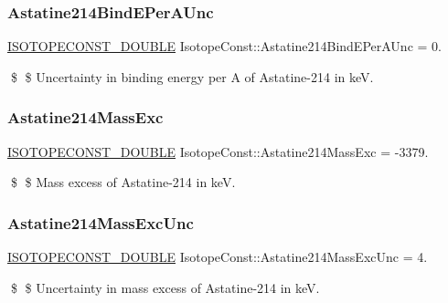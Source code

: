 \subsubsection{\texorpdfstring{Astatine214\+Bind\+E\+Per\+A\+Unc}{Astatine214BindEPerAUnc}}
{\footnotesize\ttfamily \mbox{\hyperlink{group___isotope_const-_macros_ga8f45a7272ce02c0b4c65c44636ed719a}{I\+S\+O\+T\+O\+P\+E\+C\+O\+N\+S\+T\+\_\+\+D\+O\+U\+B\+LE}} Isotope\+Const\+::\+Astatine214\+Bind\+E\+Per\+A\+Unc = 0.}

\$ \$ Uncertainty in binding energy per A of Astatine-\/214 in keV. \mbox{\label{group___isotope_const-_astatine-_at214_ga69f27648e7532989df387288bf6dc767}} 
\subsubsection{\texorpdfstring{Astatine214\+Mass\+Exc}{Astatine214MassExc}}
{\footnotesize\ttfamily \mbox{\hyperlink{group___isotope_const-_macros_ga8f45a7272ce02c0b4c65c44636ed719a}{I\+S\+O\+T\+O\+P\+E\+C\+O\+N\+S\+T\+\_\+\+D\+O\+U\+B\+LE}} Isotope\+Const\+::\+Astatine214\+Mass\+Exc = -\/3379.}

\$ \$ Mass excess of Astatine-\/214 in keV. \mbox{\label{group___isotope_const-_astatine-_at214_ga622fbe628dde12f384d95571642227a4}} 
\subsubsection{\texorpdfstring{Astatine214\+Mass\+Exc\+Unc}{Astatine214MassExcUnc}}
{\footnotesize\ttfamily \mbox{\hyperlink{group___isotope_const-_macros_ga8f45a7272ce02c0b4c65c44636ed719a}{I\+S\+O\+T\+O\+P\+E\+C\+O\+N\+S\+T\+\_\+\+D\+O\+U\+B\+LE}} Isotope\+Const\+::\+Astatine214\+Mass\+Exc\+Unc = 4.}

\$ \$ Uncertainty in mass excess of Astatine-\/214 in keV. \mbox{\label{group___isotope_const-_astatine-_at214_ga25a28f4cc25132a6691d04b33948d86b}} 
